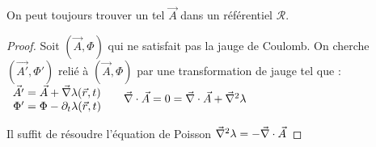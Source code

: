 	\begin{theorem}
		On peut toujours trouver un tel $\vec{A}$ dans un référentiel $\mathcal{R}$.
	\end{theorem}
	
	\begin{proof}
		Soit $(\vec{A},\Phi)$ qui ne satisfait pas la jauge de Coulomb. On cherche $(\vec{A'},\Phi')$ relié à $(\vec{A},\Phi)$ par une transformation de jauge tel que :\\
\indent
	$ 
		\begin{array}{r@{\;}l}
				\vec{A'} &=\vec{A}+\nab\lambda(\vec{r},t)\\
			\Phi'&=\Phi-\partial_t\lambda(\vec{r},t)
		\end{array}\\[10pt]\indent
		\nab\cdot\vec{A}=0=\nab\cdot\vec{A}+\nab^2\lambda
	$

	Il suffit de résoudre l'équation de Poisson $\vec{\nabla}^2\lambda=-\vec{\nabla}\cdot\vec{A}$ \qedhere
	\end{proof}
	
